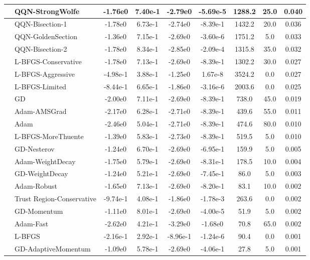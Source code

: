 \documentclass{article}
\begin{document}
\begin{longtable}{|l|l|c|c|c|c|c|c|c|}
\hline
 & QQN-StrongWolfe & -1.76e0 & 7.40e-1 & -2.79e0 & -5.69e-5 & 1288.2 & 25.0 & 0.040 \\
\hline
 & QQN-Bisection-1 & -1.78e0 & 6.73e-1 & -2.74e0 & -8.39e-1 & 1432.2 & 20.0 & 0.036 \\
\hline
 & QQN-GoldenSection & -1.36e0 & 7.15e-1 & -2.69e0 & -3.60e-6 & 1751.2 & 5.0 & 0.033 \\
\hline
 & QQN-Bisection-2 & -1.78e0 & 8.34e-1 & -2.85e0 & -2.09e-4 & 1315.8 & 35.0 & 0.032 \\
\hline
 & L-BFGS-Conservative & -1.78e0 & 7.13e-1 & -2.69e0 & -8.39e-1 & 1302.2 & 30.0 & 0.027 \\
\hline
 & L-BFGS-Aggressive & -4.98e-1 & 3.88e-1 & -1.25e0 & 1.67e-8 & 3524.2 & 0.0 & 0.027 \\
\hline
 & L-BFGS-Limited & -8.44e-1 & 6.65e-1 & -1.86e0 & -3.16e-6 & 2003.6 & 0.0 & 0.025 \\
\hline
 & GD & -2.00e0 & 7.11e-1 & -2.69e0 & -8.39e-1 & 738.0 & 45.0 & 0.019 \\
\hline
 & Adam-AMSGrad & -2.17e0 & 6.28e-1 & -2.71e0 & -8.39e-1 & 439.6 & 55.0 & 0.011 \\
\hline
 & Adam & -2.46e0 & 5.04e-1 & -2.71e0 & -8.39e-1 & 474.6 & 80.0 & 0.010 \\
\hline
 & L-BFGS-MoreThuente & -1.39e0 & 5.83e-1 & -2.73e0 & -8.39e-1 & 519.5 & 5.0 & 0.010 \\
\hline
 & GD-Nesterov & -1.24e0 & 6.70e-1 & -2.69e0 & -6.95e-1 & 159.9 & 5.0 & 0.005 \\
\hline
 & Adam-WeightDecay & -1.75e0 & 5.79e-1 & -2.69e0 & -8.31e-1 & 178.5 & 10.0 & 0.004 \\
\hline
 & GD-WeightDecay & -1.24e0 & 5.21e-1 & -2.69e0 & -7.45e-1 & 86.0 & 5.0 & 0.003 \\
\hline
 & Adam-Robust & -1.65e0 & 7.13e-1 & -2.69e0 & -8.20e-1 & 83.1 & 10.0 & 0.002 \\
\hline
 & Trust Region-Conservative & -9.74e-1 & 4.08e-1 & -1.86e0 & -1.78e-3 & 263.6 & 0.0 & 0.002 \\
\hline
 & GD-Momentum & -1.11e0 & 8.01e-1 & -2.69e0 & -4.00e-5 & 51.9 & 5.0 & 0.002 \\
\hline
 & Adam-Fast & -2.62e0 & 4.21e-1 & -3.29e0 & -1.68e0 & 70.8 & 65.0 & 0.002 \\
\hline
 & L-BFGS & -2.16e-1 & 2.92e-1 & -8.96e-1 & -1.24e-6 & 90.4 & 0.0 & 0.001 \\
\hline
 & GD-AdaptiveMomentum & -1.09e0 & 5.78e-1 & -2.69e0 & -4.06e-1 & 27.8 & 5.0 & 0.001 \\

\end{longtable}
\end{document}
